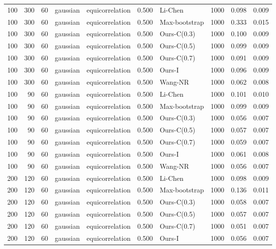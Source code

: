 \begin{tabular}{rrrllrlrrr}
100 & 300 & 60 & gaussian & equicorrelation & 0.500 & Li-Chen & 1000 & 0.098 & 0.009 \\
100 & 300 & 60 & gaussian & equicorrelation & 0.500 & Max-bootstrap & 1000 & 0.333 & 0.015 \\
100 & 300 & 60 & gaussian & equicorrelation & 0.500 & Ours-C(0.3) & 1000 & 0.100 & 0.009 \\
100 & 300 & 60 & gaussian & equicorrelation & 0.500 & Ours-C(0.5) & 1000 & 0.099 & 0.009 \\
100 & 300 & 60 & gaussian & equicorrelation & 0.500 & Ours-C(0.7) & 1000 & 0.091 & 0.009 \\
100 & 300 & 60 & gaussian & equicorrelation & 0.500 & Ours-I & 1000 & 0.096 & 0.009 \\
100 & 300 & 60 & gaussian & equicorrelation & 0.500 & Wang-NR & 1000 & 0.062 & 0.008 \\
100 & 90 & 60 & gaussian & equicorrelation & 0.500 & Li-Chen & 1000 & 0.101 & 0.010 \\
100 & 90 & 60 & gaussian & equicorrelation & 0.500 & Max-bootstrap & 1000 & 0.099 & 0.009 \\
100 & 90 & 60 & gaussian & equicorrelation & 0.500 & Ours-C(0.3) & 1000 & 0.056 & 0.007 \\
100 & 90 & 60 & gaussian & equicorrelation & 0.500 & Ours-C(0.5) & 1000 & 0.057 & 0.007 \\
100 & 90 & 60 & gaussian & equicorrelation & 0.500 & Ours-C(0.7) & 1000 & 0.059 & 0.007 \\
100 & 90 & 60 & gaussian & equicorrelation & 0.500 & Ours-I & 1000 & 0.061 & 0.008 \\
100 & 90 & 60 & gaussian & equicorrelation & 0.500 & Wang-NR & 1000 & 0.056 & 0.007 \\
200 & 120 & 60 & gaussian & equicorrelation & 0.500 & Li-Chen & 1000 & 0.098 & 0.009 \\
200 & 120 & 60 & gaussian & equicorrelation & 0.500 & Max-bootstrap & 1000 & 0.136 & 0.011 \\
200 & 120 & 60 & gaussian & equicorrelation & 0.500 & Ours-C(0.3) & 1000 & 0.058 & 0.007 \\
200 & 120 & 60 & gaussian & equicorrelation & 0.500 & Ours-C(0.5) & 1000 & 0.057 & 0.007 \\
200 & 120 & 60 & gaussian & equicorrelation & 0.500 & Ours-C(0.7) & 1000 & 0.051 & 0.007 \\
200 & 120 & 60 & gaussian & equicorrelation & 0.500 & Ours-I & 1000 & 0.056 & 0.007 \\

\end{tabular}
